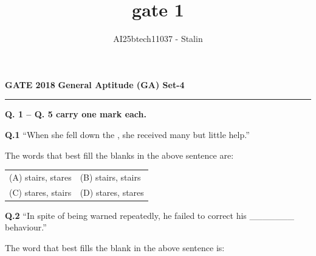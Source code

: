 \documentclass[journal,12pt,onecolumn]{IEEEtran}
\theoremstyle{remark}
\begin{document}
\title{gate 1}
\author{AI25btech11037 - Stalin}
\maketitle
\renewcommand{\thefigure}{\theenumi}
\renewcommand{\thetable}{\theenumi}



\textbf{GATE 2018} \hfill \textbf{General Aptitude (GA) Set-4}

\vspace{0.02cm}
\hrule
\vspace{0.09cm}

\textbf{Q. 1 -- Q. 5 carry one mark each.}

\vspace{0.4cm}

\textbf{Q.1} \hspace{0.2cm } ``When she fell down the \underline{\hspace{1.5cm}}, she received many \underline{\hspace{1.5cm}} but little help.''

\vspace{0.5cm}

\hspace{1.3cm}The words that best fill the blanks in the above sentence are:

\vspace{0.6cm}

\begin{tabular}{ll}
\hspace{1cm}(A) stairs, stares & \hspace{3cm}(B) stairs, stairs \\
 \hspace{1cm}(C) stares, stairs & \hspace{3cm}(D) stares, stares \\
\end{tabular}


\vspace{1cm}

\textbf{Q.2} \hspace{0.2cm} ``In spite of being warned repeatedly, he failed to correct his \_\_\_\_\_\_\_ behaviour.''

\vspace{0.3cm}

\hspace{1.2cm} The word that best fills the blank in the above sentence is:

\vspace{0.5cm}
\end{document}
